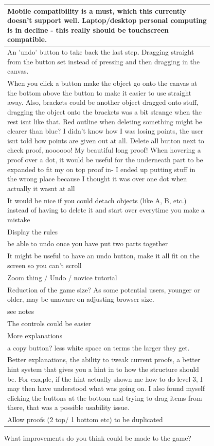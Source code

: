 \begin{figure}[H]
\begin{tabular}{|p{12cm}|} 
\hline
Mobile compatibility is a must, which this currently doesn't support well. Laptop/desktop personal computing is in decline - this really should be touchscreen compatible. \\
\hline
An 'undo' button to take back the last step. Dragging straight from the button set instead of pressing and then dragging in the canvas. \\
\hline
When you click a button make the object go onto the canvas at the bottom above the button to make it easier to use straight away. Also, brackets could be another object dragged onto stuff, dragging the object onto the brackets was a bit strange when the rest isnt like that. Red outline when deleting something might be clearer than blue? I didn't know how I was losing points, the user isnt told how points are given out at all. Delete all button next to check proof, noooooo! My beautiful long proof! When hovering a proof over a dot, it would be useful for the underneath part to be expanded to fit my on top proof in- I ended up putting stuff in the wrong place because I thought it was over one dot when actually it wasnt at all \\
\hline
It would be nice if you could detach objects (like A, B, etc.) instead of having to delete it and start over everytime you make a mistake \\
\hline
Display the rules \\
\hline
be able to undo once you have put two parts together \\
\hline
It might be useful to have an undo button, make it all fit on the screen so you can't scroll \\
\hline
Zoom thing / Undo / novice tutorial \\
\hline
Reduction of the game size? As some potential users, younger or older, may be unaware on adjusting browser size. \\
\hline
see notes \\
\hline
The controls could be easier \\
\hline
More explanations \\
\hline
a copy button? less white space on terms the larger they get. \\
\hline
Better explanations, the ability to tweak current proofs, a better hint system that gives you a hint in to how the structure should be. For exa,ple, if the hint actually shown me how to do level 3, I may then have understood what was going on. I also found myself clicking the buttons at the bottom and trying to drag items from there, that was a possible usability issue. \\
\hline
Allow proofs (2 top/ 1 bottom etc) to be duplicated \\
\hline
\end{tabular}
\caption{What improvements do you think could be made to the game?}
\end{figure}

